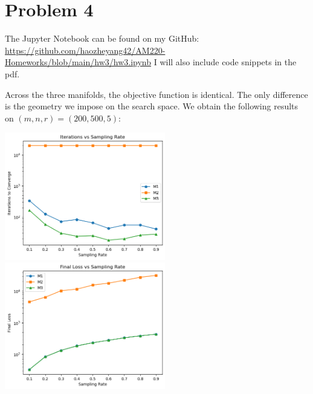 \documentclass[11pt]{scrartcl}
\begin{document}
\newpage

\section{Problem 4}

The Jupyter Notebook can be found on my GitHub: \href{https://github.com/haozheyang42/AM220-Homeworks/blob/main/hw3/hw3.ipynb}{https://github.com/haozheyang42/AM220-Homeworks/blob/main/hw3/hw3.ipynb} I will also include code snippets in the pdf.

\bigskip

Across the three manifolds, the objective function is identical. The only difference is the geometry we impose on the search space. We obtain the following results on $(m, n, r) = (200, 500, 5)$: \begin{center}
    \includegraphics[width=7cm]{hw3-img/hw3-p4-1.png}
    \includegraphics[width=7cm]{hw3-img/hw3-p4-2.png}
\end{center}
\end{document}
